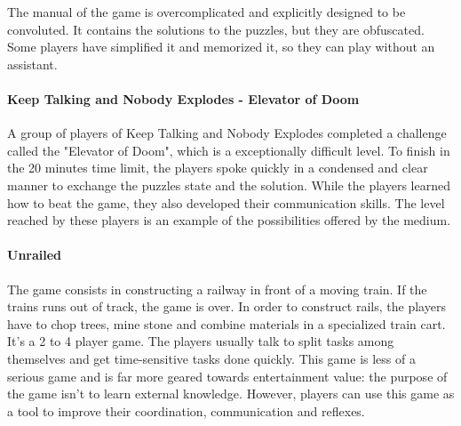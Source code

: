 \documentclass[12pt]{article}
\begin{document}
\vspace{0.4cm}
The manual of the game is overcomplicated and explicitly designed to be convoluted. It contains the solutions to the puzzles, but they are obfuscated. Some players have simplified it and memorized it, so they can play without an assistant. 

\paragraph{Keep Talking and Nobody Explodes - Elevator of Doom \cite{ktneelevator}}
A group of players of Keep Talking and Nobody Explodes completed a challenge called the "Elevator of Doom", which is a exceptionally difficult level. To finish in the 20 minutes time limit, the players spoke quickly in a condensed and clear manner to exchange the puzzles state and the solution. While the players learned how to beat the game, they also developed their communication skills. The level reached by these players is an example of the possibilities offered by the medium.

\clearpage

\paragraph{Unrailed} \cite{unrailed}
The game consists in constructing a railway in front of a moving train. If the trains runs out of track, the game is over. In order to construct rails, the players have to chop trees, mine stone and combine materials in a specialized train cart. It's a 2 to 4 player game. The players  usually talk to split tasks among themselves and get time-sensitive tasks done quickly. This game is less of a serious game and is far more geared towards entertainment value: the purpose of the game isn't to learn external knowledge. However, players can use this game as a tool to improve their coordination, communication and reflexes.

\vspace{0.4cm}
\end{document}
